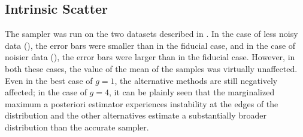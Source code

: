 %
%
%
%

\subsection{Intrinsic Scatter}

The sampler was run on the two datasets described in .  
In the case of less noisy data (), the error bars were smaller than in the fiducial case, and in the case of noisier data (), the error bars were larger than in the fiducial case.  
However, in both these cases, the value of the mean of the samples was virtually unaffected.  
Even in the best case of $g=1$, the alternative methods are still negatively affected; in the case of $g=4$, it can be plainly seen that the marginalized maximum a posteriori estimator experiences instability at the edges of the distribution and the other alternatives estimate a substantially broader distribution than the accurate sampler.

